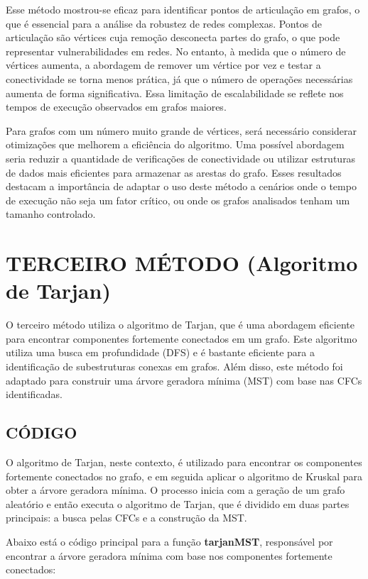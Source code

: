 Esse método mostrou-se eficaz para identificar pontos de articulação em grafos, o que é essencial para a análise da robustez de redes complexas. Pontos de articulação são vértices cuja remoção desconecta partes do grafo, o que pode representar vulnerabilidades em redes. No entanto, à medida que o número de vértices aumenta, a abordagem de remover um vértice por vez e testar a conectividade se torna menos prática, já que o número de operações necessárias aumenta de forma significativa. Essa limitação de escalabilidade se reflete nos tempos de execução observados em grafos maiores.

Para grafos com um número muito grande de vértices, será necessário considerar otimizações que melhorem a eficiência do algoritmo. Uma possível abordagem seria reduzir a quantidade de verificações de conectividade ou utilizar estruturas de dados mais eficientes para armazenar as arestas do grafo. Esses resultados destacam a importância de adaptar o uso deste método a cenários onde o tempo de execução não seja um fator crítico, ou onde os grafos analisados tenham um tamanho controlado. 





\chapter{TERCEIRO MÉTODO (Algoritmo de Tarjan)}

O terceiro método utiliza o algoritmo de Tarjan, que é uma abordagem eficiente para encontrar componentes fortemente conectados em um grafo. Este algoritmo utiliza uma busca em profundidade (DFS) e é bastante eficiente para a identificação de subestruturas conexas em grafos. Além disso, este método foi adaptado para construir uma árvore geradora mínima (MST) com base nas CFCs identificadas.

\section{\esp CÓDIGO}

O algoritmo de Tarjan, neste contexto, é utilizado para encontrar os componentes fortemente conectados no grafo, e em seguida aplicar o algoritmo de Kruskal para obter a árvore geradora mínima. O processo inicia com a geração de um grafo aleatório e então executa o algoritmo de Tarjan, que é dividido em duas partes principais: a busca pelas CFCs e a construção da MST.

Abaixo está o código principal para a função \textbf{tarjanMST}, responsável por encontrar a árvore geradora mínima com base nos componentes fortemente conectados:


